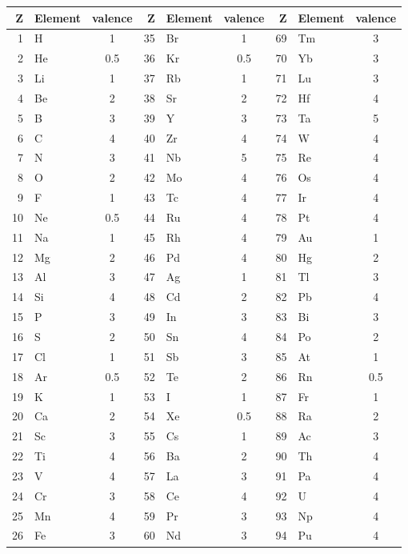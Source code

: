 \documentclass[12pt]{article}
\begin{document}
\begin{center}
\begin{tabular}{|r|l|c||r|l|c||r|l|c|}
\hline
Z & Element & valence & Z & Element & valence & Z & Element & valence \\
\hline
 1 & H   & 1   & 35 & Br  & 1   &  69 & Tm  & 3   \\
 2 & He  & 0.5 & 36 & Kr  & 0.5 &  70 & Yb  & 3   \\
 3 & Li  & 1   & 37 & Rb  & 1   &  71 & Lu  & 3   \\
 4 & Be  & 2   & 38 & Sr  & 2   &  72 & Hf  & 4   \\
 5 & B   & 3   & 39 & Y   & 3   &  73 & Ta  & 5   \\
 6 & C   & 4   & 40 & Zr  & 4   &  74 & W   & 4   \\
 7 & N   & 3   & 41 & Nb  & 5   &  75 & Re  & 4   \\
 8 & O   & 2   & 42 & Mo  & 4   &  76 & Os  & 4   \\
 9 & F   & 1   & 43 & Tc  & 4   &  77 & Ir  & 4   \\
10 & Ne  & 0.5 & 44 & Ru  & 4   &  78 & Pt  & 4   \\
11 & Na  & 1   & 45 & Rh  & 4   &  79 & Au  & 1   \\
12 & Mg  & 2   & 46 & Pd  & 4   &  80 & Hg  & 2   \\
13 & Al  & 3   & 47 & Ag  & 1   &  81 & Tl  & 3   \\
14 & Si  & 4   & 48 & Cd  & 2   &  82 & Pb  & 4   \\
15 & P   & 3   & 49 & In  & 3   &  83 & Bi  & 3   \\
16 & S   & 2   & 50 & Sn  & 4   &  84 & Po  & 2   \\
17 & Cl  & 1   & 51 & Sb  & 3   &  85 & At  & 1   \\
18 & Ar  & 0.5 & 52 & Te  & 2   &  86 & Rn  & 0.5 \\
19 & K   & 1   & 53 & I   & 1   &  87 & Fr  & 1   \\
20 & Ca  & 2   & 54 & Xe  & 0.5 &  88 & Ra  & 2   \\
21 & Sc  & 3   & 55 & Cs  & 1   &  89 & Ac  & 3   \\
22 & Ti  & 4   & 56 & Ba  & 2   &  90 & Th  & 4   \\
23 & V   & 4   & 57 & La  & 3   &  91 & Pa  & 4   \\
24 & Cr  & 3   & 58 & Ce  & 4   &  92 & U   & 4   \\
25 & Mn  & 4   & 59 & Pr  & 3   &  93 & Np  & 4   \\
26 & Fe  & 3   & 60 & Nd  & 3   &  94 & Pu  & 4   \\

\end{tabular}
\end{center}
\end{document}
